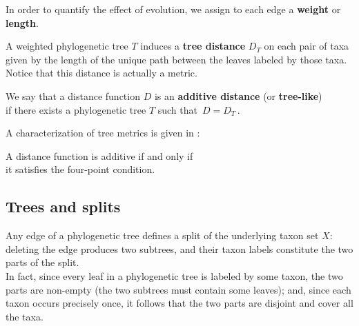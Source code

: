 \documentclass[./main.tex]{subfiles}
\begin{document}

\begin{figure}[h]
    \centering
\end{figure}

In order to quantify the effect of evolution, we assign to each edge a \textbf{weight} or \textbf{length}.\footnotemark


A weighted phylogenetic tree $T$ induces a \textbf{tree distance} $D_T$ on each pair of taxa given by the length of the unique path between the leaves labeled by those taxa. Notice that this distance is actually a metric.

We say that a distance function $D$ is an \textbf{additive distance} (or \textbf{tree-like}) \\
\bsp if there exists a phylogenetic tree $T$ such that $\, D = D_T \,$.

A characterization of tree metrics is given in \cite{Bun74}:
\begin{remarklike}[Fact]
    A distance function is additive if and only if \\
    \bsp it satisfies the four-point condition.
\end{remarklike}

\clearpage


\subsection*{Trees and splits}

Any edge of a phylogenetic tree defines a split of the underlying taxon set $X$: deleting the edge produces two subtrees, and their taxon labels constitute the two parts of the split. \\
In fact, since every leaf in a phylogenetic tree is labeled by some taxon, the two parts are non-empty (the two subtrees must contain some leaves); and, since each taxon occurs precisely once, it follows that the two parts are disjoint and cover all the taxa.
\end{document}

